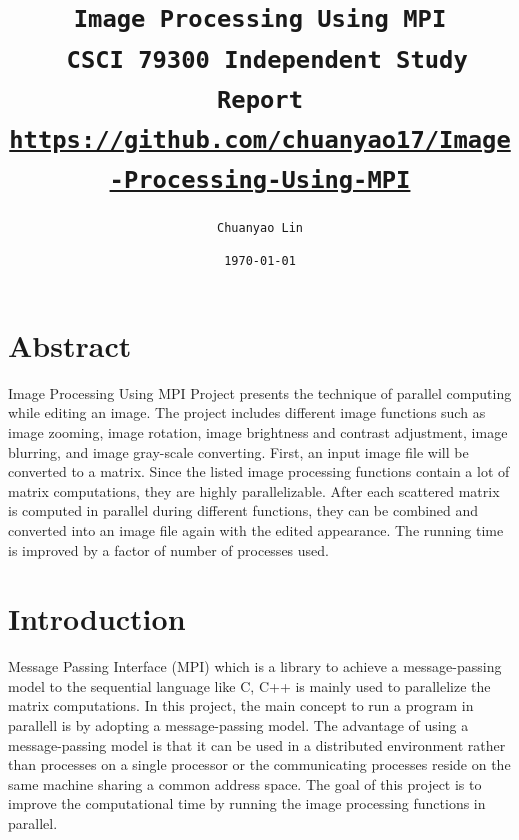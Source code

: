 \documentclass[12pt]{diazessay}
\title{\texttt{\huge{Image Processing Using MPI\\\vspace{-3mm}} \vspace{-0.35cm} {\large CSCI 79300 Independent Study Report}\\\normalsize\url{https://github.com/chuanyao17/Image-Processing-Using-MPI}}} %
\author{\texttt{Chuanyao Lin}\vspace*{-0.25em}} %
\date{\texttt{\today}} %
\begin{document}
\maketitle
\section*{Abstract}
Image Processing Using MPI Project presents the technique of parallel computing while editing an image. The project includes different image functions such as image zooming, image rotation, image brightness and contrast adjustment, image blurring, and image gray-scale converting. First, an input image file will be converted to a matrix. Since the listed image processing functions contain a lot of matrix computations, they are highly parallelizable. After each scattered matrix is computed in parallel during different functions, they can be combined and converted into an image file again with the edited appearance. The running time is improved by a factor of number of processes used.
\section*{Introduction}
Message Passing Interface (MPI) which is a library to achieve a message-passing model to the sequential language like C, C++ is mainly used to parallelize the matrix computations. In this project,
the main concept to run a program in parallell is by adopting a message-passing model. The advantage of using a message-passing model is that it can be used in a distributed environment rather than processes on a single processor or the communicating processes reside on the same machine sharing a common address space. The goal of this project is to improve the computational time by running the image processing functions in parallel.
 
\end{document}
